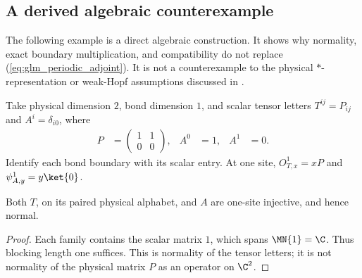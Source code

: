 \subsection{A derived algebraic counterexample}
\label{sec:glm_adjoint_counterexample}

The following example is a direct algebraic construction. It shows why
normality, exact boundary multiplication, and compatibility do not replace
(\ref{eq:glm_periodic_adjoint}). It is not a counterexample to the
physical $*$-representation or weak-Hopf assumptions discussed in
\cite[Section~5]{GarreRubio2023MPOSym}.

\begin{definition}
    \label{def:glm_adjoint_counterexample}
    \leanok
    Take physical dimension $2$, bond dimension $1$, and scalar tensor
    letters $T^{ij}=P_{ij}$ and $A^i=\delta_{i0}$, where
    \begin{align}
        P   & =\begin{pmatrix}1&1\\0&0\end{pmatrix}, &
        A^0 & =1,                                    & A^1 & =0.
        \label{eq:glm_counterexample_tensors}
    \end{align}
    Identify each bond boundary with its scalar entry. At one site,
    $O^1_{T,x}=xP$ and $\psi^1_{A,y}=y\ket{0}$.
\end{definition}

\begin{lemma}
    \label{thm:glm_counterexample_injective}
    \leanok
    Both $T$, on its paired physical alphabet, and $A$ are one-site
    injective, and hence normal.
\end{lemma}
\begin{proof}\leanok
    Each family contains the scalar matrix $1$, which spans
    $\MN{1}=\C$. Thus blocking length one suffices.
    This is normality of the tensor letters; it is not normality of
    the physical matrix $P$ as an operator on $\C^2$.
\end{proof}

